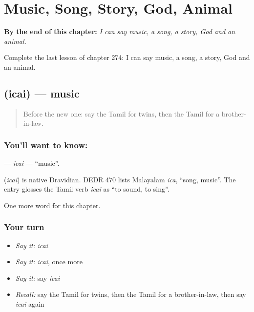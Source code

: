 
\chapter{Music, Song, Story, God, Animal}
\label{ch:ta-music-song-story-god-animal}

\begin{chapteropening}
\textbf{By the end of this chapter:} \emph{I can say music, a song, a story, God and an animal.}

Complete the last lesson of chapter 274: I can say music, a song, a story, God and an animal.
\end{chapteropening}

\section[\texorpdfstring{\ta{இசை} (icai)}{இசை (icai)}]{ (icai) — music}

\label{lesson:TA-C274-icai}



\begin{quote}
Before the new one: say the Tamil for twins, then the Tamil for a brother-in-law.
\end{quote}

\subsection*{You'll want to know: }
\textbf{} — \emph{icai} — \textquotedblleft{}music\textquotedblright{}.

\begin{cousinweb}
\textbf{} (\emph{icai}) is native Dravidian. DEDR 470 lists Malayalam \emph{ica}, \textquotedblleft{}song, music\textquotedblright{}. The entry glosses the Tamil verb \emph{icai} as \textquotedblleft{}to sound, to sing\textquotedblright{}.
\end{cousinweb}

\begin{grammarlens}[title={What you've built}]
One more word for this chapter.
\end{grammarlens}

\subsection*{Your turn}
\begin{itemize}
\raggedright
  \item \emph{Say it:} \emph{icai}
  \item \emph{Say it:} \emph{icai}, once more
  \item \emph{Say it:} say \emph{icai}
  \item \emph{Recall:} say the Tamil for twins, then the Tamil for a brother-in-law, then say \emph{icai} again
\end{itemize}

